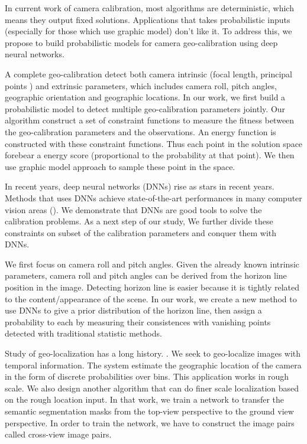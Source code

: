 In current work of camera calibration, most algorithms are
deterministic, which means they output fixed solutions. Applications
that takes probabilistic inputs (especially for those which use
graphic model) don't like it. To address this, we propose to build
probabilistic models for camera geo-calibration using deep neural
networks.

A complete geo-calibration detect both camera intrinsic (focal length,
principal points \etc) and extrinsic parameters, which includes camera
roll, pitch angles, geographic orientation and geographic locations.
In our work, we first build a probabilistic model to detect multiple
geo-calibration parameters jointly. Our algorithm construct a set of
constraint functions to measure the fitness between the
geo-calibration parameters and the observations. An energy function
is constructed with these constraint functions. Thus each point in the
solution space forebear a energy score (proportional to the
probability at that point). We then use graphic model approach to
sample these point in the space.

In recent years, deep neural networks (DNNs) rise as stars in recent
years. Methods that uses DNNs achieve state-of-the-art performances in
many computer vision areas (). We demonstrate that
DNNs are good tools to solve the calibration problems. 
As a next step of our study, We further
divide these constraints on subset of the calibration parameters and
conquer them with DNNs.

We first focus on camera roll and pitch angles. Given the already
known intrinsic parameters, camera roll and pitch angles can be
derived from the horizon line position in the image. Detecting horizon
line is easier because it is tightly related to the content/appearance
of the scene. In our work, we create a new method to use DNNs to give
a prior distribution of the horizon line, then assign a probability to
each by measuring their consistences with vanishing points detected
with traditional statistic methods.

Study of geo-localization has a long history. . We
seek to geo-localize images with temporal information. The system
estimate the geographic location of the camera in the form of discrete
probabilities over bins. This application works in rough scale. We
also design another algorithm that can do finer scale localization
based on the rough location input. In that work, we train a network to
transfer the semantic segmentation masks from the top-view perspective
to the ground view perspective. In order to train the network, we have
to construct the image pairs called cross-view image pairs.

